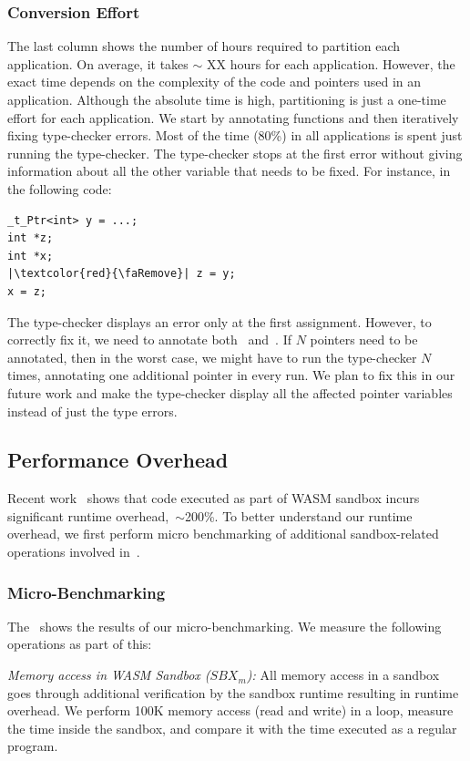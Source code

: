 \subsubsection{Conversion Effort}
The last column shows the number of hours required to partition each application.
On average, it takes $\sim$ XX hours for each application. However, the exact time depends on the complexity of the code and pointers used in an application.
Although the absolute time is high, partitioning is just a one-time effort for each application.
We start by annotating functions and then iteratively fixing type-checker errors.
Most of the time (80\%) in all applications is spent just running the type-checker.
The type-checker stops at the first error without giving information about all the other variable that needs to be fixed. 
For instance, in the following code:
\begin{verbatim}
_t_Ptr<int> y = ...; 
int *z;
int *x;
|\textcolor{red}{\faRemove}| z = y;
x = z;
\end{verbatim}
The type-checker displays an error only at the first assignment.
However, to correctly fix it, we need to annotate both~ and~.
If $N$ pointers need to be annotated, then in the worst case, we might have to run the type-checker $N$ times, annotating one additional pointer in every run.
We plan to fix this in our future work and make the type-checker display all the affected pointer variables instead of just the type errors.

\subsection{Performance Overhead}
Recent work~\cite{jangda2019not} shows that code executed as part of WASM sandbox incurs significant runtime overhead,~\ie$\sim$200\%.
To better understand our runtime overhead, we first perform micro benchmarking of additional sandbox-related operations involved in~\systemname{}.

\subsubsection{Micro-Benchmarking}
The~ shows the results of our micro-benchmarking.
We measure the following operations as part of this:

\noindent\emph{Memory access in WASM Sandbox ($SBX_{m}$):} 
All memory access in a sandbox goes through additional verification by the sandbox runtime resulting in runtime overhead.
We perform 100K memory access (read and write) in a loop, measure the time inside the sandbox, and compare it with the time executed as a regular program.

